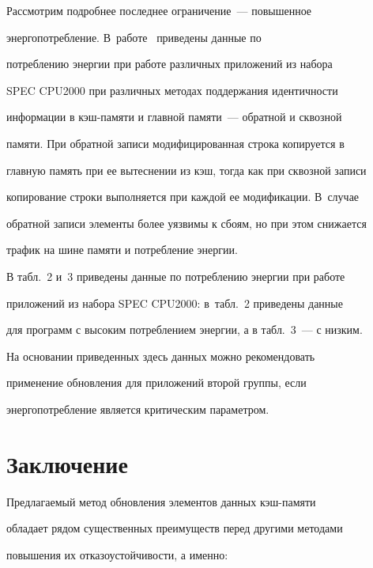     Рассмотрим подробнее последнее ограничение~--- повышенное 

энерго\-по\-треб\-ле\-ние. В~работе~\cite{1ss} приведены данные по 

потреблению энергии при работе различных приложений из набора 

SPEC CPU2000 при различных методах поддержания идентичности 

информации в кэш-памяти и главной памяти~--- обратной и сквозной 

памяти. При обратной записи модифицированная строка копируется в 

главную память при ее вытеснении из кэш, тогда как при сквозной записи 

копирование строки выполняется при каждой ее модификации. В~случае 

обратной записи элементы более уязвимы к сбоям, но при этом снижается 

трафик на шине памяти и потребление энергии. 

    

В табл.~2 и~3 приведены данные по потреблению энергии при работе 

приложений из набора SPEC CPU2000: в~табл.~2 приведены данные 

для программ с высоким потреблением энергии, а в табл.~3~--- с низким.

    



    На основании приведенных здесь данных можно рекомендовать 

применение обновления для приложений второй группы, если 

энергопотребление является критическим параметром.

    

    \section{Заключение}

    

    Предлагаемый метод обновления элементов данных кэш-памяти 

обладает рядом существенных преимуществ перед другими методами 

повышения их отказоустойчивости, а именно:



